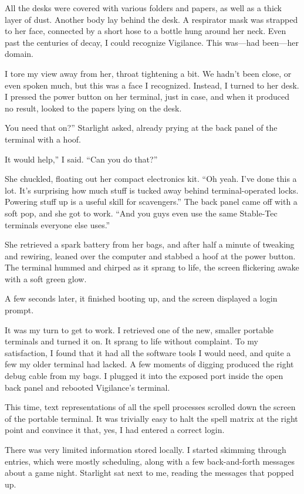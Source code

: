 All the desks were covered with various folders and papers, as well as a thick layer of dust. Another body lay behind the desk. A respirator mask was strapped to her face, connected by a short hose to a bottle hung around her neck. Even past the centuries of decay, I could recognize Vigilance. This was—had been—her domain.

I tore my view away from her, throat tightening a bit. We hadn’t been close, or even spoken much, but this was a face I recognized. Instead, I turned to her desk. I pressed the power button on her terminal, just in case, and when it produced no result, looked to the papers lying on the desk.

\leavevmode{}You need that on?” Starlight asked, already prying at the back panel of the terminal with a hoof.

\leavevmode{}It would help,” I said. “Can you do that?”

She chuckled, floating out her compact electronics kit. “Oh yeah. I’ve done this a lot. It’s surprising how much stuff is tucked away behind terminal-operated locks. Powering stuff up is a useful skill for scavengers.” The back panel came off with a soft pop, and she got to work. “And you guys even use the same Stable-Tec terminals everyone else uses.”

She retrieved a spark battery from her bags, and after half a minute of tweaking and rewiring, leaned over the computer and stabbed a hoof at the power button. The terminal hummed and chirped as it sprang to life, the screen flickering awake with a soft green glow.

A few seconds later, it finished booting up, and the screen displayed a login prompt.

It was my turn to get to work. I retrieved one of the new, smaller portable terminals and turned it on. It sprang to life without complaint. To my satisfaction, I found that it had all the software tools I would need, and quite a few my older terminal had lacked. A few moments of digging produced the right debug cable from my bags. I plugged it into the exposed port inside the open back panel and rebooted Vigilance’s terminal.

This time, text representations of all the spell processes scrolled down the screen of the portable terminal. It was trivially easy to halt the spell matrix at the right point and convince it that, yes, I had entered a correct login.

There was very limited information stored locally. I started skimming through entries, which were mostly scheduling, along with a few back-and-forth messages about a game night. Starlight sat next to me, reading the messages that popped up.

